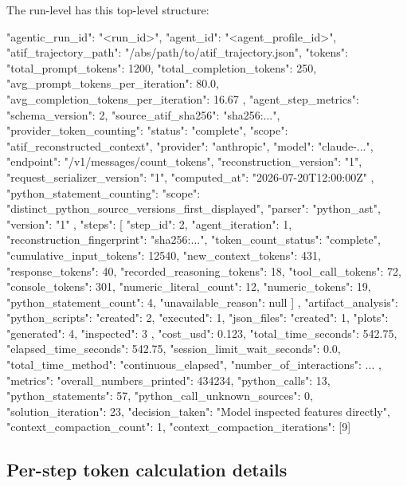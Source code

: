 \documentclass[11pt]{article}
\begin{document}
The run-level  has this top-level structure:
\begin{DocCode}
{
  "agentic_run_id": "<run_id>",
  "agent_id": "<agent_profile_id>",
  "atif_trajectory_path": "/abs/path/to/atif_trajectory.json",
  "tokens": {
    "total_prompt_tokens": 1200,
    "total_completion_tokens": 250,
    "avg_prompt_tokens_per_iteration": 80.0,
    "avg_completion_tokens_per_iteration": 16.67
  },
  "agent_step_metrics": {
    "schema_version": 2,
    "source_atif_sha256": "sha256:...",
    "provider_token_counting": {
      "status": "complete",
      "scope": "atif_reconstructed_context",
      "provider": "anthropic",
      "model": "claude-...",
      "endpoint": "/v1/messages/count_tokens",
      "reconstruction_version": "1",
      "request_serializer_version": "1",
      "computed_at": "2026-07-20T12:00:00Z"
    },
    "python_statement_counting": {
      "scope": "distinct_python_source_versions_first_displayed",
      "parser": "python_ast",
      "version": "1"
    },
    "steps": [
      {
        "step_id": 2,
        "agent_iteration": 1,
        "reconstruction_fingerprint": "sha256:...",
        "token_count_status": "complete",
        "cumulative_input_tokens": 12540,
        "new_context_tokens": 431,
        "response_tokens": 40,
        "recorded_reasoning_tokens": 18,
        "tool_call_tokens": 72,
        "console_tokens": 301,
        "numeric_literal_count": 12,
        "numeric_tokens": 19,
        "python_statement_count": 4,
        "unavailable_reason": null
      }
    ]
  },
  "artifact_analysis": {
    "python_scripts": {"created": 2, "executed": 1},
    "json_files": {"created": 1},
    "plots": {"generated": 4, "inspected": 3}
  },
  "cost_usd": 0.123,
  "total_time_seconds": 542.75,
  "elapsed_time_seconds": 542.75,
  "session_limit_wait_seconds": 0.0,
  "total_time_method": "continuous_elapsed",
  "number_of_interactions": { ... },
  "metrics": {
    "overall_numbers_printed": 434234,
    "python_calls": 13,
    "python_statements": 57,
    "python_call_unknown_sources": 0,
    "solution_iteration": 23,
    "decision_taken": "Model inspected features directly",
    "context_compaction_count": 1,
    "context_compaction_iterations": [9]
  }
}
\end{DocCode}

\label{sec:materialized-agent-step-measurements}
\subsection*{Per-step token calculation details}
\end{document}
